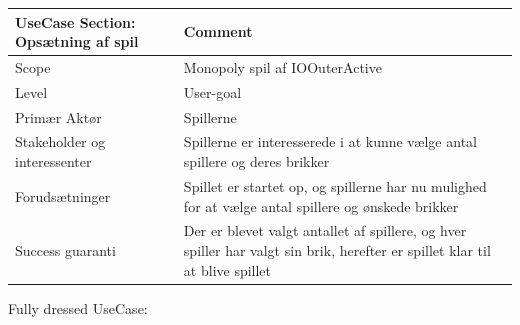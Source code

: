 \begin{center}
\begin{tabular}{ | m{10em} | m{10cm}| }
        \hline
            UseCase Section: Opsætning af spil & Comment\\
        \hline
            Scope & Monopoly spil af IOOuterActive\\
        \hline
            Level & User-goal\\
        \hline
            Primær Aktør & Spillerne\\
        \hline
            Stakeholder og interessenter & Spillerne er interesserede i at kunne vælge antal spillere og deres brikker\\
        \hline
            Forudsætninger & Spillet er startet op, og spillerne har nu mulighed for at vælge antal spillere og ønskede brikker\\
        \hline
            Success guaranti & Der er blevet valgt antallet af spillere, og hver spiller har valgt sin brik, herefter er spillet klar til at blive spillet\\
        \hline
    \end{tabular}
\end{center}
\pagebreak
Fully dressed UseCase:
